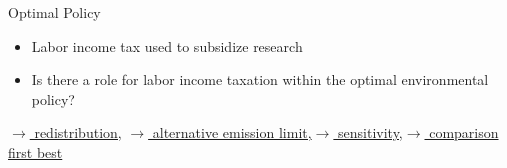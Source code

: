 \documentclass[11pt,aspectratio=169]{beamer}
\begin{document}
\begin{frame}{Optimal Policy}
\begin{figure}[h!!]
\begin{subfigure}{0.45\textwidth}
		\end{subfigure}
	\end{figure}
	\vspace{3mm}
	\pause
	\begin{block}{}
		\begin{itemize}
			\item Labor income tax used to subsidize research
			\item Is there a role for labor income taxation within the optimal environmental policy?
		\end{itemize}
	\end{block}	
	\hypertarget{backOPT}{}
	\vspace{-5.7mm}
	\hfill \hyperlink{Redis}{\tiny{$\rightarrow$ redistribution,}}
	\hyperlink{altems}{\tiny{$\rightarrow$ alternative emission limit,}}\hyperlink{sensphi}{\tiny{$\rightarrow$ sensitivity,}}\hyperlink{compfb}{\tiny{$\rightarrow$ comparison first best}}
\end{frame}


\end{document}
